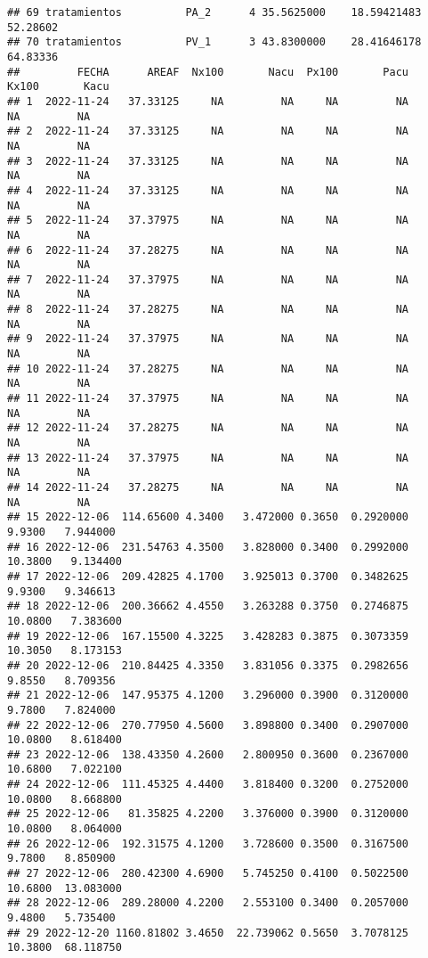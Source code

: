 \documentclass[
]{article}
\begin{document}
\begin{verbatim}
## 69 tratamientos          PA_2      4 35.5625000    18.59421483 52.28602
## 70 tratamientos          PV_1      3 43.8300000    28.41646178 64.83336
##         FECHA      AREAF  Nx100       Nacu  Px100       Pacu   Kx100       Kacu
## 1  2022-11-24   37.33125     NA         NA     NA         NA      NA         NA
## 2  2022-11-24   37.33125     NA         NA     NA         NA      NA         NA
## 3  2022-11-24   37.33125     NA         NA     NA         NA      NA         NA
## 4  2022-11-24   37.33125     NA         NA     NA         NA      NA         NA
## 5  2022-11-24   37.37975     NA         NA     NA         NA      NA         NA
## 6  2022-11-24   37.28275     NA         NA     NA         NA      NA         NA
## 7  2022-11-24   37.37975     NA         NA     NA         NA      NA         NA
## 8  2022-11-24   37.28275     NA         NA     NA         NA      NA         NA
## 9  2022-11-24   37.37975     NA         NA     NA         NA      NA         NA
## 10 2022-11-24   37.28275     NA         NA     NA         NA      NA         NA
## 11 2022-11-24   37.37975     NA         NA     NA         NA      NA         NA
## 12 2022-11-24   37.28275     NA         NA     NA         NA      NA         NA
## 13 2022-11-24   37.37975     NA         NA     NA         NA      NA         NA
## 14 2022-11-24   37.28275     NA         NA     NA         NA      NA         NA
## 15 2022-12-06  114.65600 4.3400   3.472000 0.3650  0.2920000  9.9300   7.944000
## 16 2022-12-06  231.54763 4.3500   3.828000 0.3400  0.2992000 10.3800   9.134400
## 17 2022-12-06  209.42825 4.1700   3.925013 0.3700  0.3482625  9.9300   9.346613
## 18 2022-12-06  200.36662 4.4550   3.263288 0.3750  0.2746875 10.0800   7.383600
## 19 2022-12-06  167.15500 4.3225   3.428283 0.3875  0.3073359 10.3050   8.173153
## 20 2022-12-06  210.84425 4.3350   3.831056 0.3375  0.2982656  9.8550   8.709356
## 21 2022-12-06  147.95375 4.1200   3.296000 0.3900  0.3120000  9.7800   7.824000
## 22 2022-12-06  270.77950 4.5600   3.898800 0.3400  0.2907000 10.0800   8.618400
## 23 2022-12-06  138.43350 4.2600   2.800950 0.3600  0.2367000 10.6800   7.022100
## 24 2022-12-06  111.45325 4.4400   3.818400 0.3200  0.2752000 10.0800   8.668800
## 25 2022-12-06   81.35825 4.2200   3.376000 0.3900  0.3120000 10.0800   8.064000
## 26 2022-12-06  192.31575 4.1200   3.728600 0.3500  0.3167500  9.7800   8.850900
## 27 2022-12-06  280.42300 4.6900   5.745250 0.4100  0.5022500 10.6800  13.083000
## 28 2022-12-06  289.28000 4.2200   2.553100 0.3400  0.2057000  9.4800   5.735400
## 29 2022-12-20 1160.81802 3.4650  22.739062 0.5650  3.7078125 10.3800  68.118750

\end{verbatim}
\end{document}
